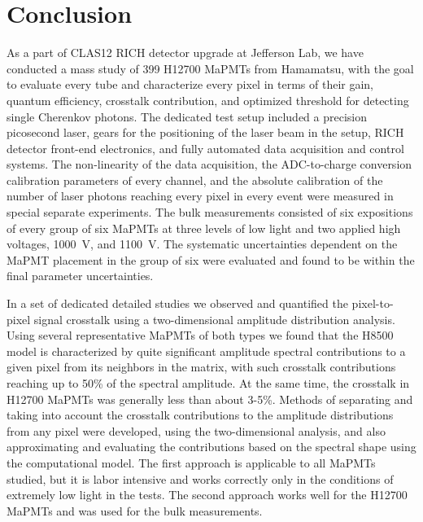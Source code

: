 \section{Conclusion}

As a part of CLAS12 RICH detector upgrade at Jefferson Lab, we have conducted a mass study of 399 H12700 MaPMTs from Hamamatsu, with the goal to evaluate every tube and characterize every pixel in terms of their gain, quantum efficiency, crosstalk contribution, and optimized threshold for detecting single Cherenkov photons. The dedicated test setup included a precision picosecond laser, 
gears for the  positioning of the laser beam in the setup,
RICH detector front-end electronics, and fully automated data acquisition and control systems. The non-linearity of the data acquisition, the ADC-to-charge conversion calibration parameters of every channel, and the absolute calibration of the number of laser photons reaching every pixel in every event were measured in special separate experiments. The bulk measurements consisted of six expositions of every group of six MaPMTs at three levels of low light and two applied high voltages, 1000~V, and 1100~V. The systematic uncertainties dependent on the MaPMT placement in the group of six were evaluated and found to be within the final parameter uncertainties.

In a set of dedicated detailed studies we observed and quantified the pixel-to-pixel signal crosstalk using a two-dimensional amplitude distribution analysis. Using several representative MaPMTs of both types we found that the H8500 model is characterized by quite significant amplitude spectral contributions to a given pixel from its neighbors in the matrix, with such crosstalk contributions reaching up to 50\% of the spectral amplitude. At the same time, the crosstalk in H12700 MaPMTs was generally less than about 3-5\%. Methods of separating and taking into account the crosstalk contributions to the amplitude distributions from any pixel were developed, using the two-dimensional analysis, and also approximating and evaluating the contributions based on the spectral shape using the computational model. The first approach is applicable to all MaPMTs studied, but it is labor intensive and works correctly only in the conditions of extremely low light in the tests. The second approach works well for the H12700 MaPMTs and was used for the bulk measurements.

